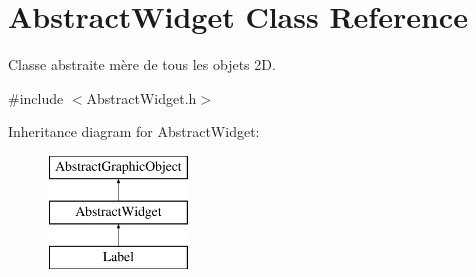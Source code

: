\hypertarget{classAbstractWidget}{\section{Abstract\-Widget Class Reference}
\label{classAbstractWidget}
}


Classe abstraite mère de tous les objets 2\-D.  




{\ttfamily \#include $<$Abstract\-Widget.\-h$>$}

Inheritance diagram for Abstract\-Widget\-:\begin{figure}[H]
\begin{center}
\leavevmode
\includegraphics[height=3.000000cm]{classAbstractWidget}
\end{center}
\end{figure}
